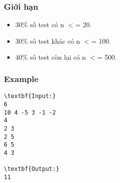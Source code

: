 \subsubsection{Giới hạn}
\begin{itemize}
	\item 30\% số test có n $<$= 20.
	\item 30\% số test khác có n $<$= 100.
	\item 40\% số test còn lại có n $<$= 500.
\end{itemize}

\subsubsection{Example}
\begin{verbatim}
\textbf{Input:}
6
10 4 -5 3 -1 -2
4
2 3
2 5
6 5
4 3

\textbf{Output:}
11
\end{verbatim}